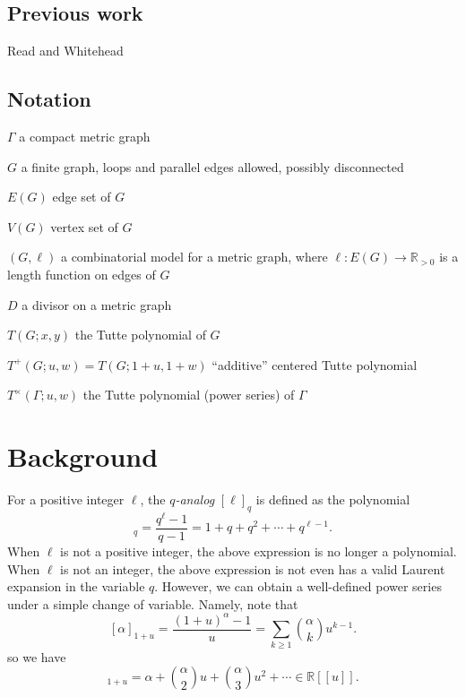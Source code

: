 \documentclass{amsart}
\theoremstyle{definition}
\newcommand{\RR}{\mathbb{R}}
\begin{document}
\subsection{Previous work} 

Read and Whitehead \cite{RW2}

\subsection{Notation}

$\Gamma$ a compact metric graph

$G$ a finite graph, 
loops and parallel edges allowed,
possibly disconnected

$E(G)$ edge set of $G$

$V(G)$ vertex set of $G$

$(G,\ell)$ a combinatorial model for a metric graph,
where 
$\ell : E(G) \to \RR_{>0}$
is a length function on edges of $G$

$D$ a divisor on a metric graph

$T(G; x,y)$ the Tutte polynomial of $G$

$T^{+}(G; u,w) = T(G; 1+u,1+w)$ ``additive'' centered Tutte polynomial

$T^\times(\Gamma; u,w)$ the Tutte polynomial  (power series) of $\Gamma$




\section{Background}
For a positive integer $\ell$,
the {\em $q$-analog}
$[\ell]_q$ is defined as
the polynomial
\begin{equation*}
[\ell]_q = \frac{q^\ell - 1}{q - 1}
= 1 + q + q^2 + \cdots + q^{\ell -1} .
\end{equation*}
When $\ell$ is not a positive integer, the above expression is no longer a polynomial.
When $\ell$ is not an integer, the above expression is not even has a valid Laurent expansion in the variable $q$.
However, we can obtain a well-defined power series under a simple change of variable.
Namely, note that
\[ [\alpha]_{1+u} = \frac{(1+u)^\alpha - 1}{u}
= \sum_{k \geq 1} \binom{\alpha}{k}u^{k-1} .
\]
so we have 
\begin{equation}
[\alpha]_{1+u} = \alpha + \binom{\alpha}{2} u + \binom{\alpha}{3} u^2 + \cdots
\in \RR[[u]] .
\end{equation}
\end{document}
